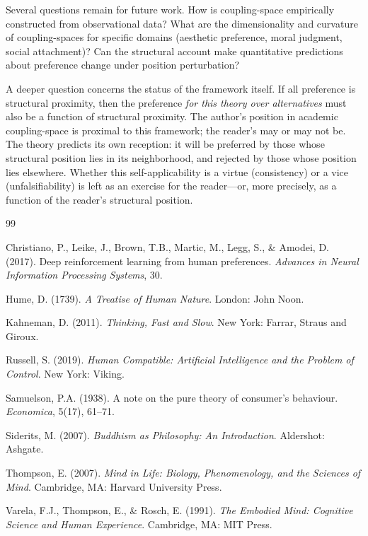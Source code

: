 \documentclass[12pt,a4paper]{article}
\begin{document}
Several questions remain for future work. How is coupling-space empirically constructed from observational data? What are the dimensionality and curvature of coupling-spaces for specific domains (aesthetic preference, moral judgment, social attachment)? Can the structural account make quantitative predictions about preference change under position perturbation?

A deeper question concerns the status of the framework itself. If all preference is structural proximity, then the preference \emph{for this theory over alternatives} must also be a function of structural proximity. The author's position in academic coupling-space is proximal to this framework; the reader's may or may not be. The theory predicts its own reception: it will be preferred by those whose structural position lies in its neighborhood, and rejected by those whose position lies elsewhere. Whether this self-applicability is a virtue (consistency) or a vice (unfalsifiability) is left as an exercise for the reader---or, more precisely, as a function of the reader's structural position.

\begin{thebibliography}{99}

Christiano, P., Leike, J., Brown, T.B., Martic, M., Legg, S., \& Amodei, D. (2017). Deep reinforcement learning from human preferences. \textit{Advances in Neural Information Processing Systems}, 30.

Hume, D. (1739). \textit{A Treatise of Human Nature}. London: John Noon.

Kahneman, D. (2011). \textit{Thinking, Fast and Slow}. New York: Farrar, Straus and Giroux.

Russell, S. (2019). \textit{Human Compatible: Artificial Intelligence and the Problem of Control}. New York: Viking.

Samuelson, P.A. (1938). A note on the pure theory of consumer's behaviour. \textit{Economica}, 5(17), 61--71.

Siderits, M. (2007). \textit{Buddhism as Philosophy: An Introduction}. Aldershot: Ashgate.

Thompson, E. (2007). \textit{Mind in Life: Biology, Phenomenology, and the Sciences of Mind}. Cambridge, MA: Harvard University Press.

Varela, F.J., Thompson, E., \& Rosch, E. (1991). \textit{The Embodied Mind: Cognitive Science and Human Experience}. Cambridge, MA: MIT Press.

\end{thebibliography}
\end{document}
